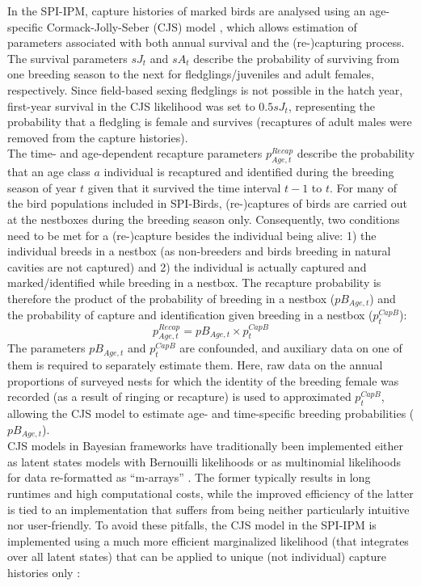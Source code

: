 \documentclass[
]{book}
\begin{document}
In the SPI-IPM, capture histories of marked birds are analysed using an age-specific Cormack-Jolly-Seber (CJS) model \citep{cormack1964, jolly1965, seber1965}, which allows estimation of parameters associated with both annual survival and the (re-)capturing process.\\
The survival parameters \(sJ_t\) and \(sA_t\) describe the probability of surviving from one breeding season to the next for fledglings/juveniles and adult females, respectively. Since field-based sexing fledglings is not possible in the hatch year, first-year survival in the CJS likelihood was set to \(0.5sJ_t\), representing the probability that a fledgling is female and survives (recaptures of adult males were removed from the capture histories).\\
The time- and age-dependent recapture parameters \(p_{Age,t}^{Recap}\) describe the probability that an age class \(a\) individual is recaptured and identified during the breeding season of year \(t\) given that it survived the time interval \(t-1\) to \(t\). For many of the bird populations included in SPI-Birds, (re-)captures of birds are carried out at the nestboxes during the breeding season only. Consequently, two conditions need to be met for a (re-)capture besides the individual being alive: 1) the individual breeds in a nestbox (as non-breeders and birds breeding in natural cavities are not captured) and 2) the individual is actually captured and marked/identified while breeding in a nestbox. The recapture probability is therefore the product of the probability of breeding in a nestbox (\(pB_{Age,t}\)) and the probability of capture and identification given breeding in a nestbox (\(p_t^{CapB}\)):
\begin{equation}
  p_{Age,t}^{Recap}=pB_{Age,t}\times p_t^{CapB}
\end{equation}
The parameters \(pB_{Age,t}\) and \(p_t^{CapB}\) are confounded, and auxiliary data on one of them is required to separately estimate them. Here, raw data on the annual proportions of surveyed nests for which the identity of the breeding female was recorded (as a result of ringing or recapture) is used to approximated \(p_t^{CapB}\), allowing the CJS model to estimate age- and time-specific breeding probabilities (\(pB_{Age,t}\)).\\
CJS models in Bayesian frameworks have traditionally been implemented either as latent states models with Bernouilli likelihoods or as multinomial likelihoods for data re-formatted as ``m-arrays'' \citep{gimenez2007, kery2011}. The former typically results in long runtimes and high computational costs, while the improved efficiency of the latter is tied to an implementation that suffers from being neither particularly intuitive nor user-friendly. To avoid these pitfalls, the CJS model in the SPI-IPM is implemented using a much more efficient marginalized likelihood (that integrates over all latent states) that can be applied to unique (not individual) capture histories only \citep[following][]{turek2016}:
\end{document}
